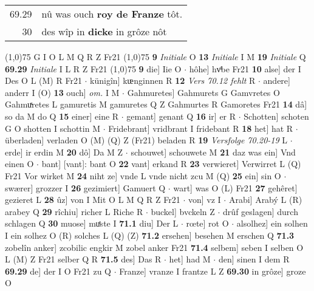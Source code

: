 \documentclass[8pt,a4paper,notitlepage]{article}
\begin{document}
\begin{table}[ht]
\begin{minipage}[t]{0.5\linewidth}
\begin{tabular}{rl}
69.29 & nû was ouch \textbf{roy de Franze} tôt.\\ 
30 & des wîp in \textbf{dicke} in grôze nôt\\ 
\end{tabular}
\scriptsize
\line(1,0){75} \newline
G I O L M Q R Z Fr21 \newline
\line(1,0){75} \newline
\textbf{9} \textit{Initiale} O  \textbf{13} \textit{Initiale} I M  \textbf{19} \textit{Initiale} Q  \textbf{69.29} \textit{Initiale} I L R Z Fr21  \newline
\line(1,0){75} \newline
\textbf{9} die] Iie O  $\cdot$ hôhe] hvͦbe Fr21 \textbf{10} alse] der I Des O L (M) R Fr21  $\cdot$ künigîn] kᵫnginnen R \textbf{12} \textit{Vers 70.12 fehlt} R   $\cdot$ andere] anderr I (O) \textbf{13} ouch] \textit{om.} I M  $\cdot$ Gahmuretes] Gahmurets G Gamvretes O Gahmuͯretes L gamuretis M gamuretes Q Z Gahmurtes R Gamoretes Fr21 \textbf{14} dâ] so da M do Q \textbf{15} einer] eine R  $\cdot$ gemant] genant Q \textbf{16} ir] er R  $\cdot$ Schotten] schoten G O shotten I schottin M  $\cdot$ Fridebrant] vridbrant I fridebant R \textbf{18} het] hat R  $\cdot$ überladen] verladen O (M) (Q) Z (Fr21) beladen R \textbf{19} \textit{Versfolge 70.20-19} L   $\cdot$ erde] ir erdin M \textbf{20} dô] Da M Z  $\cdot$ schouwet] schouwete M \textbf{21} daz was ein] Vnd einen O  $\cdot$ bant] [vant]: bant O \textbf{22} vant] erkand R \textbf{23} verwieret] Verwirret L (Q) Fr21 Vor wirket M \textbf{24} niht ze] vnde L vnde nicht zcu M (Q) \textbf{25} ein] sin O  $\cdot$ swærer] grozzer I \textbf{26} gezimiert] Gamuert Q  $\cdot$ wart] was O (L) Fr21 \textbf{27} gehêret] gezieret L \textbf{28} ûz] von I Mit O L M Q R Z Fr21  $\cdot$ von] vz I  $\cdot$ Arabi] Arabý L (R) arabey Q \textbf{29} rîchiu] richer L Riche R  $\cdot$ buckel] bvckeln Z  $\cdot$ drûf geslagen] durch schlagen Q \textbf{30} muose] muͤste I \textbf{71.1} diu] Der L  $\cdot$ rœte] rot O  $\cdot$ alsolhez] ein solhen I ein solhez O (R) solches L (Q) (Z) \textbf{71.2} ersehen] besehen M erschen Q \textbf{71.3} zobelîn anker] zcobilic engkir M zobel anker Fr21 \textbf{71.4} selbem] seben I selben O L (M) Z Fr21 selber Q R \textbf{71.5} des] Das R  $\cdot$ het] had M  $\cdot$ den] sinen I dem R \textbf{69.29} de] der I O Fr21 zu Q  $\cdot$ Franze] vranze I frantze L Z \textbf{69.30} in grôze] groze O \newline
\end{minipage}
\hspace{0.5cm}

\end{table}
\end{document}
